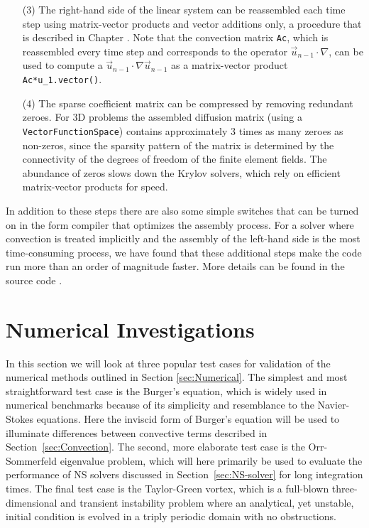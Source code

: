 \begin{itemize}
\item[(3)] The right-hand side of the linear system
can be reassembled each time step using matrix-vector products and
vector additions only, a procedure that is described in
Chapter \cite{langtangen}. Note that the convection matrix {\fontsize{12pt}{12pt}\texttt{Ac}},
which is reassembled every time step and corresponds to the
operator $\vec{u}_{n-1}\cdot\nabla$, can be used to compute a
$\vec{u}_{n-1}\cdot\nabla\vec{u}_{n-1}$ as a matrix-vector
product {\fontsize{12pt}{12pt}\verb!Ac*u_1.vector()!}.

\item[(4)] The sparse coefficient matrix can be compressed by removing
redundant zeroes. For 3D problems the
assembled diffusion matrix (using a {\fontsize{12pt}{12pt}\texttt{VectorFunctionSpace}}) 
contains approximately 3 times as many zeroes as non-zeros, since
the sparsity pattern of the matrix is determined by the connectivity of
the degrees of freedom of the finite element fields. The
abundance of zeros slows down the Krylov solvers, which rely on
efficient matrix-vector products for speed.

\end{itemize}
In addition to these steps there are also some simple switches that
can be turned on in the form compiler that optimizes the assembly
process. For a solver where convection is treated implicitly and the
assembly of the left-hand side is the most time-consuming process, we
have found that these additional steps make the code run more than an
order of magnitude faster. More details can be found in the source
code \cite{folder}.

\section{Numerical Investigations}
\label{sec:testcases}
In this section we will look at three popular test cases for validation of the numerical methods outlined in Section \ref{sec:Numerical}. The simplest and most straightforward test case is the Burger's equation, which is widely used in numerical benchmarks because of its simplicity and resemblance to the Navier-Stokes equations. Here the inviscid form of Burger's equation will be used to illuminate differences between convective terms described in Section~\ref{sec:Convection}. The second, more elaborate test case is the Orr-Sommerfeld eigenvalue problem, which will here primarily be used to evaluate the performance of NS solvers discussed in Section~\ref{sec:NS-solver} for long integration times. The final test case is the Taylor-Green vortex, which is a full-blown three-dimensional and transient instability problem where an analytical, yet unstable, initial condition is evolved in a triply periodic domain with no obstructions.

